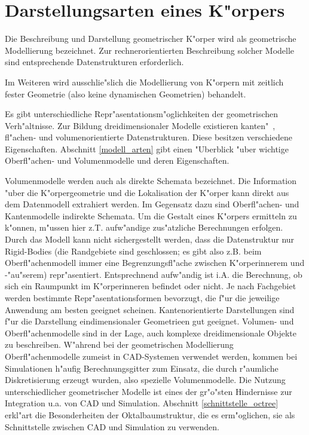 %
%

\chapter{Darstellungsarten eines K"orpers}
\label{geombeschr}
%
%
%

Die Beschreibung und Darstellung geometrischer K"orper wird als geometrische 
Modellierung bezeichnet. Zur rechnerorientierten Beschreibung solcher Modelle 
sind entsprechende Datenstrukturen erforderlich.

Im Weiteren wird ausschlie"slich die Modellierung von K"orpern mit
zeitlich fester Geometrie (also keine dynamischen Geometrien) behandelt.

Es gibt unterschiedliche Repr"asentationsm"oglichkeiten der geometrischen 
Verh"altnisse. Zur Bildung dreidimensionaler Modelle existieren 
kanten"~, fl"achen- und volumenorientierte Datenstrukturen. Diese besitzen 
verschiedene Eigenschaften.
Abschnitt \ref{modell_arten} gibt einen "Uberblick "uber wichtige 
Oberfl"achen- und Volumenmodelle und deren Eigenschaften.

Volumenmodelle werden auch als direkte Schemata bezeichnet. Die 
Information "uber die K"orpergeometrie und die Lokalisation der K"orper 
kann direkt aus dem Datenmodell extrahiert werden. Im Gegensatz dazu 
sind Oberfl"achen- und Kantenmodelle indirekte Schemata. Um die Gestalt 
eines K"orpers ermitteln zu k"onnen, m"ussen hier z.T. aufw"andige zus"atzliche 
Berechnungen erfolgen. Durch das Modell kann nicht sichergestellt werden,
dass die Datenstruktur nur Rigid-Bodies (die Randgebiete sind 
geschlossen; es gibt also z.B. beim Oberfl"achenmodell immer eine 
Begrenzungsfl"ache zwischen K"orperinnerem und -"au"serem) repr"asentiert.
Entsprechnend aufw"andig ist i.A. die Berechnung, ob sich ein Raumpunkt 
im K"orperinneren befindet oder nicht.
Je nach Fachgebiet werden bestimmte Repr"asentationsformen bevorzugt, die 
f"ur die jeweilige Anwendung am besten geeignet scheinen.
Kantenorientierte Darstellungen sind f"ur die Darstellung eindimensionaler 
Geometrieen gut geeignet. 
Volumen- und Oberfl"achenmodelle sind in der Lage, auch komplexe 
dreidimensionale Objekte zu beschreiben. W"ahrend bei der geometrischen 
Modellierung Oberfl"achenmodelle zumeist in CAD-Systemen verwendet werden, 
kommen bei Simulationen h"aufig Berechnungsgitter zum Einsatz, die durch 
r"aumliche Diskretisierung erzeugt wurden, also spezielle Volumenmodelle.
Die Nutzung unterschiedlicher geometrischer Modelle ist eines der gr"o"sten
Hindernisse zur Integration u.a. von CAD und Simulation.
Abschnitt \ref{schnittstelle_octree} erkl"art die Besonderheiten der 
Oktalbaumstruktur, die es erm"oglichen, sie als Schnittstelle zwischen 
CAD und Simulation zu verwenden.






